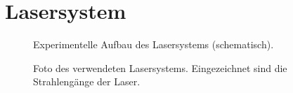 \section{Lasersystem}\label{sec:lasersystem}
\begin{figure}[h]
 	\centering
	\caption[Experimenteller Aufbau des Lasersystems, schematisch]{Experimentelle
	Aufbau des Lasersystems (schematisch).}
	\label{fig:experimenteller_aufbau_lasersystem}
\end{figure}
\begin{figure}[h]
 	\centering
	\caption[Experimenteller Aufbau des Lasersystems -
	Foto]{Foto des verwendeten Lasersystems. Eingezeichnet sind die
	Strahlengänge der Laser.}
	\label{fig:experimenteller_aufbau_lasersystem_foto}
\end{figure}
